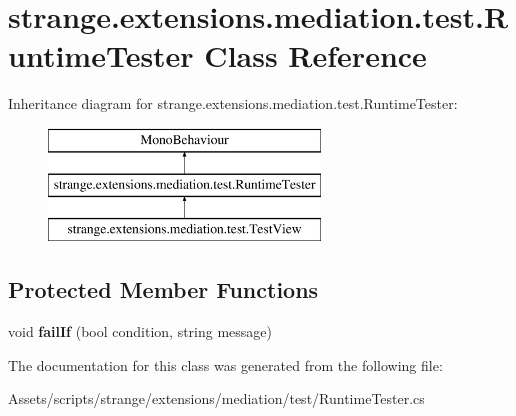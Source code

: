 \hypertarget{classstrange_1_1extensions_1_1mediation_1_1test_1_1_runtime_tester}{\section{strange.\-extensions.\-mediation.\-test.\-Runtime\-Tester Class Reference}
\label{classstrange_1_1extensions_1_1mediation_1_1test_1_1_runtime_tester}
}
Inheritance diagram for strange.\-extensions.\-mediation.\-test.\-Runtime\-Tester\-:\begin{figure}[H]
\begin{center}
\leavevmode
\includegraphics[height=3.000000cm]{classstrange_1_1extensions_1_1mediation_1_1test_1_1_runtime_tester}
\end{center}
\end{figure}
\subsection*{Protected Member Functions}
\begin{DoxyCompactItemize}
\item 
\hypertarget{classstrange_1_1extensions_1_1mediation_1_1test_1_1_runtime_tester_a227cdc1ab58bcc3220a251ae838c41bd}{void {\bfseries fail\-If} (bool condition, string message)}\label{classstrange_1_1extensions_1_1mediation_1_1test_1_1_runtime_tester_a227cdc1ab58bcc3220a251ae838c41bd}

\end{DoxyCompactItemize}


The documentation for this class was generated from the following file\-:\begin{DoxyCompactItemize}
\item 
Assets/scripts/strange/extensions/mediation/test/Runtime\-Tester.\-cs\end{DoxyCompactItemize}
